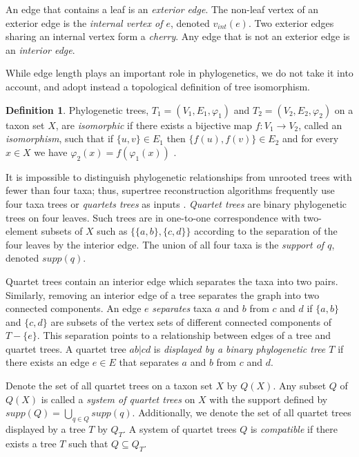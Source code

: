 \documentclass[final,3p,times]{elsarticle}
\theoremstyle{definition}
\newtheorem{defn}[thm]{Definition}
\theoremstyle{remark}
\begin{document}
An edge that contains a leaf is an \emph{exterior edge}. The non-leaf vertex of an exterior edge is  the \emph{internal vertex of $e$}, denoted $v_{int}(e)$. Two exterior edges sharing an internal vertex form a \emph{cherry}. Any edge that is not an exterior edge is an \emph{interior edge}.

While edge length plays an important role in phylogenetics, we do not take it into account, and adopt instead a topological definition of tree isomorphism.

\begin{defn}
Phylogenetic trees, $T_1=(V_1, E_1, \varphi_1)$ and  $T_2=(V_2, E_2, \varphi_2)$ on a taxon set $X$, are \emph{isomorphic} if there exists a bijective map $f : V_1 \rightarrow V_2$, called an \emph{isomorphism}, such that if $\{u,v\} \in E_1$ then $\{f (u), f (v)\} \in E_2$ and  for every  $x \in X$ we have $\varphi_2 (x)=f (\varphi_1 (x))$ . 
\end{defn}

It is impossible to distinguish phylogenetic relationships from unrooted trees with fewer than four taxa; thus, supertree reconstruction algorithms frequently use four taxa trees or \emph{quartets trees} as inputs \cite{snir, warnow, strimmer}. \emph{Quartet trees} are binary phylogenetic trees on four leaves. Such trees are in one-to-one correspondence with two-element subsets of $X$ such as $\{\{a, b\},\{c,d\}\}$ according to the separation of the four leaves by the interior edge. The union of all four taxa is the \emph{support of $q$}, denoted \emph{$supp(q)$}. 

Quartet trees contain an interior edge which separates the taxa into two pairs. Similarly, removing an interior edge of a tree separates the graph into two connected components. An edge $e$ \emph{separates} taxa $a$ and $b$ from $c$ and $d$ if $\{a,b\}$ and $\{c,d\}$ are subsets of the vertex sets of different connected components of $T-\{e\}$. This separation points to a relationship between edges of a tree and quartet trees. A quartet tree $ab|cd$ is \emph{displayed by a binary phylogenetic tree $T$} if there exists an edge $e \in E$ that separates $a$ and $b$ from $c$ and $d$.  

Denote the set of all quartet trees on a taxon set $X$ by $Q(X)$. Any subset $Q$ of $Q(X)$ is called a \emph{system of quartet trees} on $X$ with the support defined by $supp(Q)=\displaystyle\bigcup_{q\in Q} supp(q)$. Additionally, we denote the set of all quartet trees displayed by a tree $T$ by $Q_T$. A system of quartet trees $Q$ is \emph{compatible} if there exists a tree $T$ such that $Q \subseteq Q_T$. 
\end{document}
